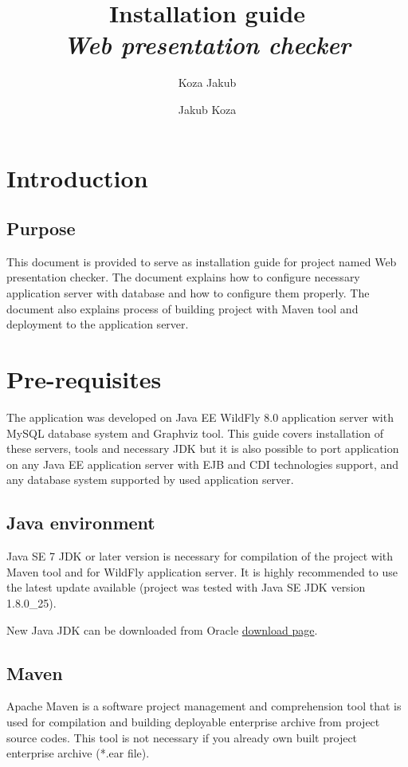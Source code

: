 \documentclass[12pt,a4paper]{article}
\author{Koza Jakub}
\author{Jakub Koza}
\title{Installation guide\\\textit{Web presentation checker}}
\begin{document}
\maketitle
\tableofcontents
\newpage

\section{Introduction}
\subsection{Purpose}
This document is provided to serve as installation guide for project named Web presentation checker. The document explains how to configure necessary application server with database and how to configure them properly. The document also explains process of building project with Maven tool and deployment to the application server.

\section{Pre-requisites}
The application was developed on Java EE WildFly 8.0 application server with MySQL database system and Graphviz tool. This guide covers installation of these servers, tools and necessary JDK but it is also possible to port application on any Java EE application server with EJB and CDI technologies support, and any database system supported by used application server.

\subsection{Java environment}
Java SE 7 JDK or later version is necessary for compilation of the project with Maven tool and for WildFly application server. It is highly recommended to use the latest update available (project was tested with Java SE JDK version 1.8.0\_25). 

New Java JDK can be downloaded from Oracle \href{http://www.oracle.com/technetwork/java/javase/downloads/index.html}{download page}.

\subsection{Maven}
Apache Maven is a software project management and comprehension tool that is used for compilation and building deployable enterprise archive from project source codes. This tool is not necessary if you already own built project enterprise archive (*.ear file). 
\end{document}
